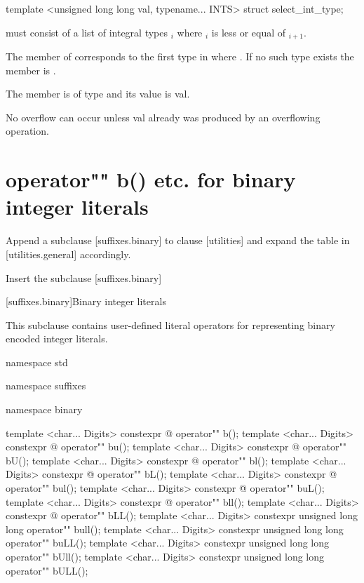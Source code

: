 \documentclass[ebook,11pt,article]{memoir}
\begin{document}
\exitexample
\begin{itemdecl}
template <unsigned long long val, typename... INTS>
struct select_int_type;
\end{itemdecl}

\begin{itemdescr}
\pnum
\requires
{} must consist of a list of integral types $_i$ where $_i$ is less or equal of $_{i+1}$.

\pnum
\effects
The member  of  corresponds to the first type  in  where . If no such type exists the member  is .

\pnum
The member  is of type  and its value is {val}.

\enternote
No overflow can occur unless val already was produced by an overflowing operation.
\exitnote 

\end{itemdescr}
\section{operator"" b() etc. for binary integer literals}
Append a subclause [suffixes.binary] to clause [utilities] and expand the table in [utilities.general] accordingly.

Insert the subclause [suffixes.binary]

[suffixes.binary]{Binary integer literals}

\pnum
This subclause contains user-defined literal operators for representing binary encoded integer literals.

\begin{codeblock}
namespace std{
namespace suffixes{
namespace binary{

template <char... Digits>
constexpr @\seebelow@ 
operator"" b();
template <char... Digits>
constexpr @\seebelow@ 
operator"" bu();
template <char... Digits>
constexpr @\seebelow@ 
operator"" bU();
template <char... Digits>
constexpr @\seebelow@ 
operator"" bl();
template <char... Digits>
constexpr @\seebelow@ 
operator"" bL();
template <char... Digits>
constexpr @\seebelow@ 
operator"" bul();
template <char... Digits>
constexpr @\seebelow@ 
operator"" buL();
template <char... Digits>
constexpr @\seebelow@ 
operator"" bll();
template <char... Digits>
constexpr @\seebelow@ 
operator"" bLL();
template <char... Digits>
constexpr unsigned long long
operator"" bull();
template <char... Digits>
constexpr unsigned long long
operator"" buLL();
template <char... Digits>
constexpr unsigned long long
operator"" bUll();
template <char... Digits>
constexpr unsigned long long
operator"" bULL();

}}} 
\end{codeblock}
\end{document}
